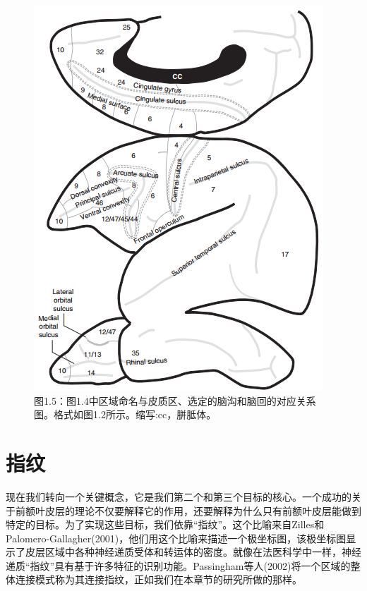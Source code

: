 \begin{figure}[!htb]
	\centering
	\includegraphics[width=0.5\linewidth]{image_pfc/Fig_1_5}
	\caption*{图1.5：图1.4中区域命名与皮质区、选定的脑沟和脑回的对应关系图。格式如图1.2所示。缩写:cc，胼胝体。}
\end{figure}



\section{指纹}
现在我们转向一个关键概念，它是我们第二个和第三个目标的核心。一个成功的关于前额叶皮层的理论不仅要解释它的作用，还要解释为什么只有前额叶皮层能做到特定的目标。为了实现这些目标，我们依靠“指纹”。这个比喻来自Zilles和Palomero-Gallagher(2001)，他们用这个比喻来描述一个极坐标图，该极坐标图显示了皮层区域中各种神经递质受体和转运体的密度。就像在法医科学中一样，神经递质“指纹”具有基于许多特征的识别功能。Passingham等人(2002)将一个区域的整体连接模式称为其连接指纹，正如我们在本章节的研究所做的那样。

